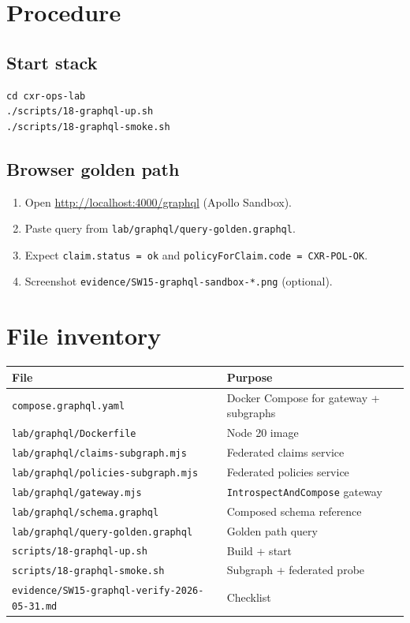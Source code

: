 \documentclass[11pt,a4paper]{report}
\begin{document}
\chapter{Procedure}

\section{Start stack}
\begin{lstlisting}[style=bash]
cd cxr-ops-lab
./scripts/18-graphql-up.sh
./scripts/18-graphql-smoke.sh
\end{lstlisting}

\section{Browser golden path}
\begin{enumerate}
  \item Open \url{http://localhost:4000/graphql} (Apollo Sandbox).
  \item Paste query from \texttt{lab/graphql/query-golden.graphql}.
  \item Expect \texttt{claim.status = ok} and \texttt{policyForClaim.code = CXR-POL-OK}.
  \item Screenshot \texttt{evidence/SW15-graphql-sandbox-*.png} (optional).
\end{enumerate}

\chapter{File inventory}

\begin{longtable}{@{}p{5cm}p{8cm}@{}}
\toprule
File & Purpose \\
\midrule
\endhead
\texttt{compose.graphql.yaml} & Docker Compose for gateway + subgraphs \\
\texttt{lab/graphql/Dockerfile} & Node 20 image \\
\texttt{lab/graphql/claims-subgraph.mjs} & Federated claims service \\
\texttt{lab/graphql/policies-subgraph.mjs} & Federated policies service \\
\texttt{lab/graphql/gateway.mjs} & \texttt{IntrospectAndCompose} gateway \\
\texttt{lab/graphql/schema.graphql} & Composed schema reference \\
\texttt{lab/graphql/query-golden.graphql} & Golden path query \\
\texttt{scripts/18-graphql-up.sh} & Build + start \\
\texttt{scripts/18-graphql-smoke.sh} & Subgraph + federated probe \\
\texttt{evidence/SW15-graphql-verify-2026-05-31.md} & Checklist \\
\bottomrule
\end{longtable}
\end{document}

